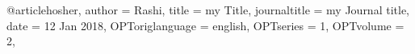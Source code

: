 @article{hosher,
	author = {Rashi},
	title = {my Title},
	journaltitle = {my Journal title},
	date = {12 Jan 2018},
	OPToriglanguage = {english},
	OPTseries = {1},
	OPTvolume = {2},
}
